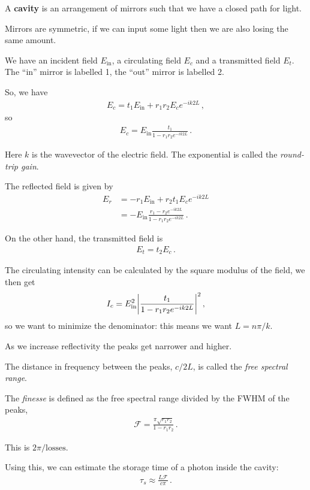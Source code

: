 \documentclass[main.tex]{subfiles}
\begin{document}
A \textbf{cavity} is an arrangement of mirrors such that we have a closed path for light.

Mirrors are symmetric, if we can input some light then we are also losing the same amount.

We have an incident field \(E _{\text{in}}\), a circulating field \(E_{c}\) and a transmitted field \(E_{t}\). The ``in'' mirror is labelled 1, the ``out'' mirror is labelled 2. 

So, we have 
%
\begin{align}
E_{c} = t_1 E _{\text{in}} + r_1 r_2 E_{c} e^{-ik 2L} 
\,,
\end{align}
%
so 
%
\begin{align}
E_{c} = E _{\text{in}} \frac{t_1 }{1 - r_1 r_2 e^{-ik2L}}
\,.
\end{align}

Here \(k\) is the wavevector of the electric field. The exponential is called the \emph{round-trip gain}. 

The reflected field is given by 
%
\begin{subequations}
\begin{align}
E_{r} &= -r_1 E _{\text{in}} + r_2 t_1 E_{c} e^{-ik2L}  \\
&= -E _{\text{in}} \frac{r_1 - r_2 e^{-ik 2L}}{1 - r_1 r_2 e^{-ik2L}}
\,.
\end{align}
\end{subequations}

On the other hand, the transmitted field is 
%
\begin{align}
E_{t} = t_2 E_c 
\,.
\end{align}

The circulating intensity can be calculated by the square modulus of the field, we then get 
%
\begin{align}
I_{c} = E^2 _{\text{in}} \abs{\frac{t_1 }{1 - r_1 r_2 e^{-ik2L}}}^2
\,,
\end{align}
%
so we want to minimize the denominator: this means we want \(L = n \pi / k\). 

As we increase reflectivity the peaks get narrower and higher. 

The distance in frequency between the peaks, \(c / 2L\), is called the \emph{free spectral range}. 

The \emph{finesse} is defined as the free spectral range divided by the FWHM of the peaks, 
%
\begin{align}
\mathcal{F} = \frac{\pi \sqrt{r_1 r_2 }}{1 - r_1 r_2 }
\,.
\end{align}

This is \(2 \pi  / \text{losses}\).

Using this, we can estimate the storage time of a photon inside the cavity: 
%
\begin{align}
\tau_{s} \approx \frac{L \mathcal{F}}{c \pi }
\,.
\end{align}
\end{document}
